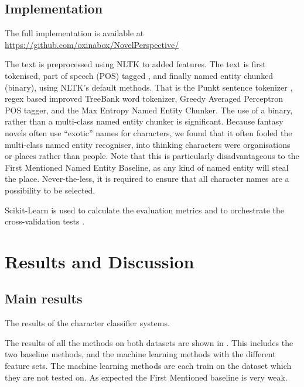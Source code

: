 \documentclass[11pt,a4paper]{article}
\newcommand{\parencite}{\citep}
\begin{document}
\subsection{Implementation}
The full implementation is available at \url{https://github.com/oxinabox/NovelPerspective/}

The text is preprocessed using NLTK \parencite{NLTK} to added features.
The text is first tokenised, part of speech (POS) tagged , and finally named entity chunked (binary), using NLTK's default methods.
That is the Punkt sentence tokenizer \parencite{kiss2006unsupervised}, regex based improved TreeBank word tokenizer, Greedy Averaged Perceptron POS tagger, and the Max Entropy Named Entity Chunker.
The use of a binary, rather than a multi-class named entity chunker is significant.
Because fantasy novels often use ``exotic'' names for characters, we found that it often  fooled the multi-class named entity recogniser, into thinking characters were organisations or places rather than people.
Note that this is particularly disadvantageous to the First Mentioned Named Entity Baseline, as any kind of named entity will steal the place.
Never-the-less, it is required to ensure that all character names are a possibility to be selected.

Scikit-Learn is used to calculate the evaluation metrics and to orchestrate the cross-validation tests \parencite{scikit-learn}.


\section{Results and Discussion}\label{sec:results-and-discussion}

\subsection{Main results}

\begin{table}
	\begin{adjustbox}{max width=\textwidth}
	\end{adjustbox}
	
	\caption{The results of the character classifier systems.} \label{tbl:resmain}
\end{table}

The results of all the methods on both datasets are shown in .
This includes the two baseline methods, and the machine learning methods with the different feature sets.
The machine learning methods are each train on the dataset which they are not tested on.
As expected the First Mentioned baseline is very weak.
\end{document}
